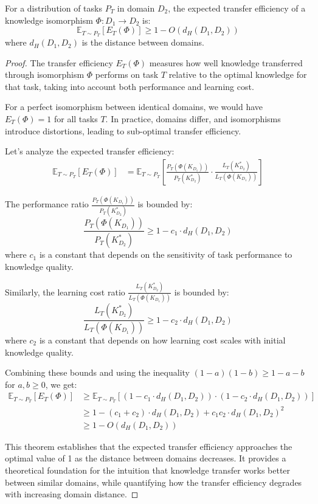 \begin{theorem}
For a distribution of tasks $P_T$ in domain $D_2$, the expected transfer efficiency of a knowledge isomorphism $\Phi: D_1 \to D_2$ is:
\begin{equation}
\mathbb{E}_{T \sim P_T}[E_T(\Phi)] \geq 1 - O(d_H(D_1, D_2))
\end{equation}
where $d_H(D_1, D_2)$ is the distance between domains.
\end{theorem}

\begin{proof}
The transfer efficiency $E_T(\Phi)$ measures how well knowledge transferred through isomorphism $\Phi$ performs on task $T$ relative to the optimal knowledge for that task, taking into account both performance and learning cost.

For a perfect isomorphism between identical domains, we would have $E_T(\Phi) = 1$ for all tasks $T$. In practice, domains differ, and isomorphisms introduce distortions, leading to sub-optimal transfer efficiency.

Let's analyze the expected transfer efficiency:
\begin{align}
\mathbb{E}_{T \sim P_T}[E_T(\Phi)] &= \mathbb{E}_{T \sim P_T}\left[\frac{P_T(\Phi(K_{D_1}))}{P_T(K_{D_2}^*)} \cdot \frac{L_T(K_{D_2}^*)}{L_T(\Phi(K_{D_1}))}\right]
\end{align}

The performance ratio $\frac{P_T(\Phi(K_{D_1}))}{P_T(K_{D_2}^*)}$ is bounded by:
\begin{equation}
\frac{P_T(\Phi(K_{D_1}))}{P_T(K_{D_2}^*)} \geq 1 - c_1 \cdot d_H(D_1, D_2)
\end{equation}
where $c_1$ is a constant that depends on the sensitivity of task performance to knowledge quality.

Similarly, the learning cost ratio $\frac{L_T(K_{D_2}^*)}{L_T(\Phi(K_{D_1}))}$ is bounded by:
\begin{equation}
\frac{L_T(K_{D_2}^*)}{L_T(\Phi(K_{D_1}))} \geq 1 - c_2 \cdot d_H(D_1, D_2)
\end{equation}
where $c_2$ is a constant that depends on how learning cost scales with initial knowledge quality.

Combining these bounds and using the inequality $(1-a)(1-b) \geq 1 - a - b$ for $a,b \geq 0$, we get:
\begin{align}
\mathbb{E}_{T \sim P_T}[E_T(\Phi)] &\geq \mathbb{E}_{T \sim P_T}[(1 - c_1 \cdot d_H(D_1, D_2)) \cdot (1 - c_2 \cdot d_H(D_1, D_2))] \\
&\geq 1 - (c_1 + c_2) \cdot d_H(D_1, D_2) + c_1 c_2 \cdot d_H(D_1, D_2)^2 \\
&\geq 1 - O(d_H(D_1, D_2))
\end{align}

This theorem establishes that the expected transfer efficiency approaches the optimal value of 1 as the distance between domains decreases. It provides a theoretical foundation for the intuition that knowledge transfer works better between similar domains, while quantifying how the transfer efficiency degrades with increasing domain distance.
\end{proof}

